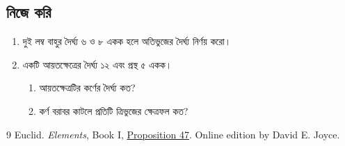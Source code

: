 \documentclass[11pt,a4paper]{article}
\begin{document}
\subsection{নিজে করি}
\begin{enumerate}
  \item দুই লম্ব বাহুর দৈর্ঘ্য ৬ ও ৮ একক হলে অতিভুজের দৈর্ঘ্য নির্ণয় করো।
  \item একটি আয়তক্ষেত্রের দৈর্ঘ্য ১২ এবং প্রস্থ ৫ একক।
    \begin{enumerate}
      \item আয়তক্ষেত্রটির কর্ণের দৈর্ঘ্য কত?
      \item কর্ণ বরাবর কাটলে প্রতিটি ত্রিভুজের ক্ষেত্রফল কত?
    \end{enumerate}
\end{enumerate}

\begin{thebibliography}{9}
   Euclid. \textit{Elements}, Book I,
  \href{https://mathcs.clarku.edu/~djoyce/elements/bookI/propI47.html}{Proposition 47}.
  Online edition by David E. Joyce.
\end{thebibliography}
\end{document}
